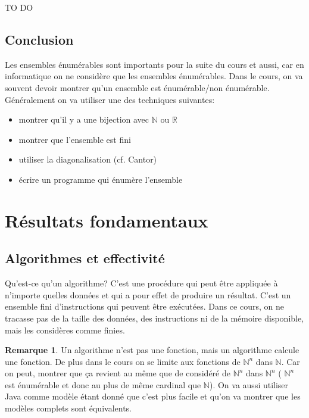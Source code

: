 \documentclass[11pt,a4paper]{article}
\newcommand{\R}{\mathbb{R}}
\newcommand{\N}{\mathbb{N}}
\theoremstyle{definition}
\newtheorem{myrem}[mydef]{Remarque}
\begin{document}
TO DO


\subsection{Conclusion}
\label{sub:conclusion}
Les ensembles énumérables sont importants pour la suite du cours et aussi, car en 
informatique on ne considère que les ensembles énumérables.
Dans le cours, on va souvent devoir montrer qu'un ensemble est énumérable/non énumérable.
Généralement on va utiliser une des techniques suivantes: 
\begin{itemize}
	\item montrer qu'il y a une bijection avec $\N$ ou $\R$
	\item montrer que l'ensemble est fini
	\item utiliser la diagonalisation (cf. Cantor)
	\item écrire un programme qui énumère l'ensemble
\end{itemize}


\section{Résultats fondamentaux}
\label{sec:r_sultats_fondamentaux}

\subsection{Algorithmes et effectivité}
\label{sub:algorithmes_et_effectivit_}
Qu'est-ce qu'un algorithme? C'est une procédure qui peut être appliquée à n'importe
quelles données et qui a pour effet de produire un résultat. C'est un ensemble fini
d'instructions qui peuvent être exécutées. Dans ce cours, on ne tracasse pas 
de la taille des données, des instructions ni de la mémoire disponible, mais 
les considères comme finies. 

\begin{myrem}
	Un algorithme n'est pas une fonction, mais un algorithme calcule une 
	fonction.
	De plus dans le cours on se limite aux fonctions de $\N^n$ dans $\N$. Car on peut,
	montrer que ça revient au même que de considéré de $\N^n$ dans $\N^n$ (
	$\N^n$ est énumérable et donc au plus de même cardinal que $\N$). On va aussi
	utiliser Java comme modèle étant donné que c'est plus facile et qu'on va montrer 
	que les modèles complets sont équivalents.
\end{myrem}
\end{document}
